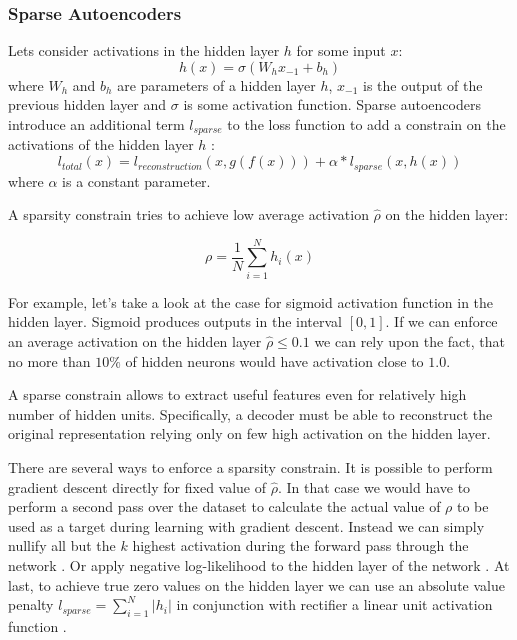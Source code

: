 \subsubsection{Sparse Autoencoders}\label{ch:sae}

Lets consider activations in the hidden layer $h$ for some input $x$:
\begin{equation}
  h(x) = \sigma(W_{h}x_{-1} + b_{h})
\end{equation}
where $W_h$ and $b_h$ are parameters of a hidden layer $h$, $x_{-1}$ is the output of the previous hidden layer and $\sigma$ is some activation function.
Sparse autoencoders introduce an additional term $l_{sparse}$ to the loss function to add a constrain on the activations of the hidden layer $h$ \cite{Ng2011}:
\begin{equation}
  l_{total}(x) = l_{reconstruction}(x, g(f(x))) + \alpha*l_{sparse}(x, h(x))
\end{equation}
where $\alpha$ is a constant parameter.

A sparsity constrain tries to achieve low average activation $\hat{\rho}$ on the hidden layer:

\begin{equation}\label{eq:avgh}
  \rho = \frac{1}{N} \sum_{i=1}^N h_i(x)
\end{equation}

For example, let's take a look at the case for sigmoid activation function in the hidden layer.
Sigmoid produces outputs in the interval $[0, 1]$. If we can enforce an average activation on the hidden layer $\hat{\rho} \leq 0.1$ we can rely upon the fact, that no more than $10\%$ of hidden neurons would have activation close to $1.0$.

A sparse constrain allows to extract useful features even for relatively high number of hidden units. Specifically, a decoder must be able to reconstruct the original representation relying only on few high activation on the hidden layer.

There are several ways to enforce a sparsity constrain.
It is possible to perform gradient descent directly for fixed value of $\hat{\rho}$. In that case we would have to perform a second pass over the dataset to calculate the actual value of $\rho$ to be used as a target during learning with gradient descent. Instead we can simply nullify all but the $k$ highest activation during the forward pass through the network \cite{Kulkarni2015}.
Or apply negative log-likelihood to the hidden layer of the network \cite{Zhao2015}.
At last, to achieve true zero values on the hidden layer we can use an absolute value penalty $l_{sparse}=\sum_{i=1}^N |h_i|$ in conjunction with rectifier a linear unit activation function \cite{Glorot2011}.

